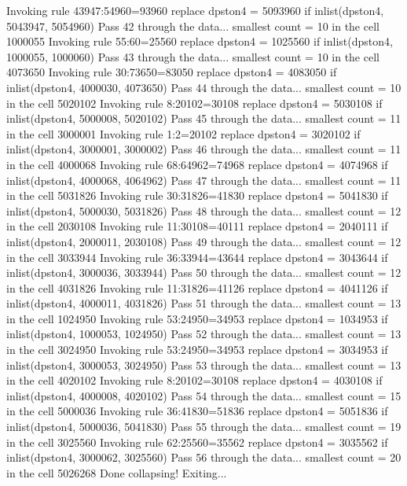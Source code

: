   Invoking rule 43947:54960=93960
  replace dpston4 = 5093960 if inlist(dpston4, 5043947, 5054960)
Pass 42 through the data...
  smallest count = 10 in the cell      1000055
  Invoking rule 55:60=25560
  replace dpston4 = 1025560 if inlist(dpston4, 1000055, 1000060)
Pass 43 through the data...
  smallest count = 10 in the cell      4073650
  Invoking rule 30:73650=83050
  replace dpston4 = 4083050 if inlist(dpston4, 4000030, 4073650)
Pass 44 through the data...
  smallest count = 10 in the cell      5020102
  Invoking rule 8:20102=30108
  replace dpston4 = 5030108 if inlist(dpston4, 5000008, 5020102)
Pass 45 through the data...
  smallest count = 11 in the cell      3000001
  Invoking rule 1:2=20102
  replace dpston4 = 3020102 if inlist(dpston4, 3000001, 3000002)
Pass 46 through the data...
  smallest count = 11 in the cell      4000068
  Invoking rule 68:64962=74968
  replace dpston4 = 4074968 if inlist(dpston4, 4000068, 4064962)
Pass 47 through the data...
  smallest count = 11 in the cell      5031826
  Invoking rule 30:31826=41830
  replace dpston4 = 5041830 if inlist(dpston4, 5000030, 5031826)
Pass 48 through the data...
  smallest count = 12 in the cell      2030108
  Invoking rule 11:30108=40111
  replace dpston4 = 2040111 if inlist(dpston4, 2000011, 2030108)
Pass 49 through the data...
  smallest count = 12 in the cell      3033944
  Invoking rule 36:33944=43644
  replace dpston4 = 3043644 if inlist(dpston4, 3000036, 3033944)
Pass 50 through the data...
  smallest count = 12 in the cell      4031826
  Invoking rule 11:31826=41126
  replace dpston4 = 4041126 if inlist(dpston4, 4000011, 4031826)
Pass 51 through the data...
  smallest count = 13 in the cell      1024950
  Invoking rule 53:24950=34953
  replace dpston4 = 1034953 if inlist(dpston4, 1000053, 1024950)
Pass 52 through the data...
  smallest count = 13 in the cell      3024950
  Invoking rule 53:24950=34953
  replace dpston4 = 3034953 if inlist(dpston4, 3000053, 3024950)
Pass 53 through the data...
  smallest count = 13 in the cell      4020102
  Invoking rule 8:20102=30108
  replace dpston4 = 4030108 if inlist(dpston4, 4000008, 4020102)
Pass 54 through the data...
  smallest count = 15 in the cell      5000036
  Invoking rule 36:41830=51836
  replace dpston4 = 5051836 if inlist(dpston4, 5000036, 5041830)
Pass 55 through the data...
  smallest count = 19 in the cell      3025560
  Invoking rule 62:25560=35562
  replace dpston4 = 3035562 if inlist(dpston4, 3000062, 3025560)
Pass 56 through the data...
  smallest count = 20 in the cell      5026268
  Done collapsing! Exiting...
{\smallskip}
